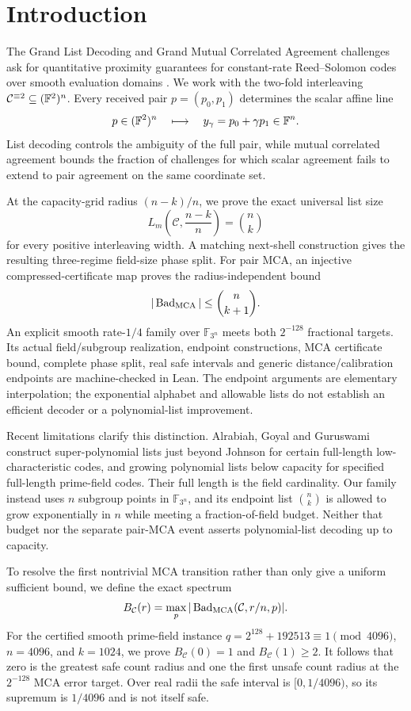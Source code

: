 \section{Introduction}

The Grand List Decoding and Grand Mutual Correlated Agreement challenges ask
for quantitative proximity guarantees for constant-rate Reed--Solomon codes
over smooth evaluation domains \cite{arnonBonehFenzi2026}.  We work with the
two-fold interleaving
\(\mathcal C^{\equiv 2}\subseteq(\mathbb{F}^2)^n\).  Every received pair
\(p=(p_0,p_1)\) determines the scalar affine line
\[
  p\in(\mathbb{F}^2)^n
  \quad\longmapsto\quad
  y_\gamma=p_0+\gamma p_1\in\mathbb{F}^n .
\]
List decoding controls the ambiguity of the full pair, while mutual correlated
agreement bounds the fraction of challenges for which scalar agreement fails
to extend to pair agreement on the same coordinate set.

At the capacity-grid radius \((n-k)/n\), we prove the exact universal list
size
\[
  L_m\!\left(\mathcal C,\frac{n-k}{n}\right)=\binom nk
\]
for every positive interleaving width.  A matching next-shell construction
gives the resulting three-regime field-size phase split. For pair MCA, an
injective compressed-certificate map proves the radius-independent bound
\[
  |\operatorname{Bad}_{\operatorname{MCA}}|\le\binom n{k+1}.
\]
An explicit smooth rate-\(1/4\) family over \(\mathbb F_{3^n}\) meets both
\(2^{-128}\) fractional targets. Its actual field/subgroup realization,
endpoint constructions, MCA certificate bound, complete phase split, real
safe intervals and generic distance/calibration endpoints are machine-checked
in Lean. The endpoint arguments are elementary interpolation; the exponential
alphabet and allowable lists do not establish an efficient decoder or a
polynomial-list improvement.

Recent limitations clarify this distinction. Alrabiah, Goyal and Guruswami
\cite[Theorems~1.1, 1.2 and~1.4]{alrabiahGoyalGuruswami2026} construct
super-polynomial lists just beyond Johnson for certain full-length
low-characteristic codes, and growing polynomial lists below capacity for
specified full-length prime-field codes. Their full length is the field
cardinality. Our family instead uses \(n\) subgroup points in
\(\mathbb F_{3^n}\), and its endpoint list \(\binom nk\) is allowed to
grow exponentially in \(n\) while meeting a fraction-of-field budget.
Neither that budget nor the separate pair-MCA event asserts polynomial-list
decoding up to capacity.

To resolve the first nontrivial MCA transition rather than only give a
uniform sufficient bound, we define the exact spectrum
\[
  B_{\mathcal C}(r)=\max_p
  |\operatorname{Bad}_{\operatorname{MCA}}(\mathcal C,r/n,p)|.
\]
For the certified smooth prime-field instance
\(q=2^{128}+192513\equiv1\pmod {4096}\), \(n=4096\), and \(k=1024\), we prove
\(B_{\mathcal C}(0)=1\) and \(B_{\mathcal C}(1)\ge2\).  It follows that zero
is the greatest safe count radius and one the first unsafe count radius at
the \(2^{-128}\) MCA error target. Over real radii the safe interval is
\([0,1/4096)\), so its supremum is \(1/4096\) and is not itself safe.

